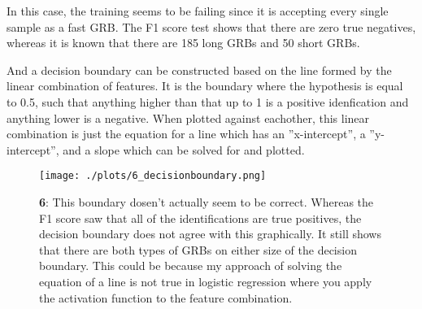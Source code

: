 In this case, the training seems to be failing since it is accepting every single sample as a fast GRB. The F1 score test shows that there are zero true negatives, whereas it is known that there are 185 long GRBs and 50 short GRBs.

And a decision boundary can be constructed based on the line formed by the linear combination of features. It is the boundary where the hypothesis is equal to 0.5, such that anything higher than that up to 1 is a positive idenfication and anything lower is a negative. When plotted against eachother, this linear combination is just the equation for a line which has an ''x-intercept'', a ''y-intercept'', and a slope which can be solved for and plotted.

\begin{figure}[h!]
  \centering
  \texttt{[image: ./plots/6\_decisionboundary.png]}
  \caption{\textbf{6}: This boundary dosen't actually seem to be correct. Whereas the F1 score saw that all of the identifications are true positives, the decision boundary does not agree with this graphically. It still shows that there are both types of GRBs on either size of the decision boundary. This could be because my approach of solving the equation of a line is not true in logistic regression where you apply the activation function to the feature combination.}
  \label{fig:decisionboundary}
\end{figure}